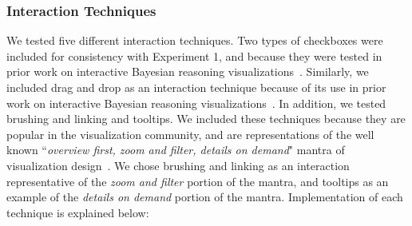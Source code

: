 \subsubsection{Interaction Techniques}
We tested five different interaction techniques. Two types of checkboxes were included for consistency with Experiment 1, and because they were tested in prior work on interactive Bayesian reasoning visualizations~\cite{tsai2011Interactive}. Similarly, we included drag and drop as an interaction technique because of its use in prior work on interactive Bayesian reasoning visualizations~\cite{khan2018Interactive}. 
In addition, we tested brushing and linking and tooltips. We included these techniques because they are popular in the visualization community, and are representations of the well known ``\textit{overview first, zoom and filter, details on demand}" mantra of visualization design~\cite{shneiderman1996Eyes}. We chose brushing and linking as an interaction representative of the \textit{zoom and filter} portion of the mantra,
and tooltips as an example of the \textit{details on demand} portion of the mantra. Implementation of each technique is explained below:    


